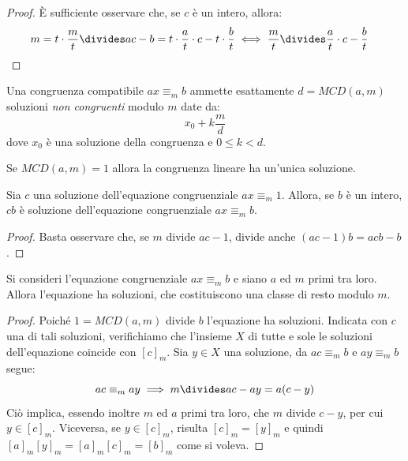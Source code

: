 \begin{proof}
	È sufficiente osservare che, se $c$ è un intero, allora:
	\begin{align*}
		m &= t \cdot \frac{m}{t} \divides ac-b = t \cdot \frac{a}{t} \cdot c-t \cdot \frac{b}{t} \iff \frac{m}{t} \divides \frac{a}{t} \cdot c -\frac{b}{t}
	\end{align*}
\end{proof}

\begin{corolbox}
	Una congruenza compatibile $ax \equiv_{m} b$ ammette esattamente $d = MCD(a,m)$ soluzioni \textit{non congruenti} modulo $m$ date da:
	\begin{equation}
		x_{0} + k \frac{m}{d}
	\end{equation}
	dove $x_{0}$ è una soluzione della congruenza e $0 \leq k < d$.
\end{corolbox}

\begin{osservation}
	Se $MCD(a,m)=1$ allora la congruenza lineare ha un'unica soluzione.
\end{osservation}

\begin{propbox}
	Sia $c$ una soluzione dell'equazione congruenziale $ax \equiv_{m} 1$. Allora, se $b$ è un intero, $cb$ è soluzione dell'equazione congruenziale $ax \equiv_{m} b$.
\end{propbox}

\begin{proof}
	Basta osservare che, se $m$ divide $ac-1$, divide anche $(ac-1)b =acb-b$.
\end{proof}

\begin{propbox}
	Si consideri l'equazione congruenziale $ax \equiv_{m} b$ e siano $a$ ed $m$ primi tra loro. Allora l'equazione ha soluzioni, che costituiscono una classe di resto modulo $m$.
\end{propbox}

\begin{proof}
	Poiché $1=MCD(a,m)$ divide $b$ l'equazione ha soluzioni. Indicata con $c$ una di tali soluzioni, verifichiamo che l'insieme $X$ di tutte e sole le soluzioni dell'equazione coincide con $[c]_{m}$. Sia $y \in X$ una soluzione, da $ac \equiv_{m} b$ e $ay \equiv_{m} b$ segue:
	\begin{displaymath}
		ac \equiv_{m} ay \implies m \divides ac-ay = a (c-y)
	\end{displaymath}
	Ciò implica, essendo inoltre $m$ ed $a$ primi tra loro, che $m$ divide $c-y$, per cui $y \in [c]_{m}$. Viceversa, se $y \in [c]_{m}$, risulta $[c]_{m}=[y]_{m}$ e quindi $[a]_{m}[y]_{m}=[a]_{m}[c]_{m}=[b]_{m}$ come si voleva.
\end{proof}

